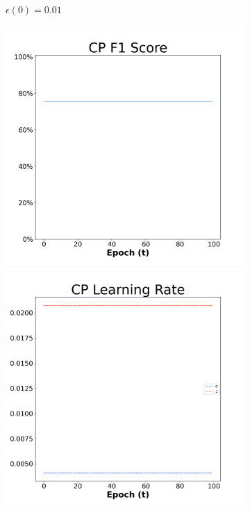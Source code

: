 \begin{figure}[H]
\begin{subfigure}{0.3\textwidth}
\caption{$\epsilon(0)=0.01$}
\end{subfigure}\hfil %
\begin{subfigure}{0.3\textwidth}
\includegraphics[width=\linewidth]{images/exper2/NSP/CP_0.03_f1.png}
\includegraphics[width=\linewidth]{images/exper2/NSP/CP_0.03_lr.png}

\end{subfigure}
\end{figure}
